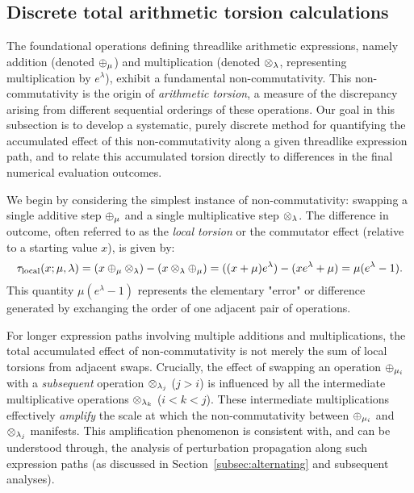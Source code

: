 \subsection{Discrete total arithmetic torsion calculations}\label{subsec:discrete-calculations}

The foundational operations defining threadlike arithmetic expressions, namely addition (denoted $\oplus_{\mu}$) and multiplication (denoted $\otimes_{\lambda}$, representing multiplication by $e^{\lambda}$), exhibit a fundamental non-commutativity. This non-commutativity is the origin of \emph{arithmetic torsion}, a measure of the discrepancy arising from different sequential orderings of these operations. Our goal in this subsection is to develop a systematic, purely discrete method for quantifying the accumulated effect of this non-commutativity along a given threadlike expression path, and to relate this accumulated torsion directly to differences in the final numerical evaluation outcomes.

We begin by considering the simplest instance of non-commutativity: swapping a single additive step $\oplus_{\mu}$ and a single multiplicative step $\otimes_{\lambda}$. The difference in outcome, often referred to as the \emph{local torsion} or the commutator effect (relative to a starting value $x$), is given by:
\begin{equation}
\tau_{\text{local}}(x; \mu, \lambda) = (x \oplus_{\mu} \otimes_{\lambda}) - (x \otimes_{\lambda} \oplus_{\mu}) = ( (x+\mu)e^{\lambda} ) - ( xe^{\lambda}+\mu ) = \mu(e^{\lambda} - 1).
\label{eq:local_torsion}
\end{equation}
This quantity $\mu(e^{\lambda}-1)$ represents the elementary "error" or difference generated by exchanging the order of one adjacent pair of operations.

For longer expression paths involving multiple additions and multiplications, the total accumulated effect of non-commutativity is not merely the sum of local torsions from adjacent swaps. Crucially, the effect of swapping an operation $\oplus_{\mu_i}$ with a \emph{subsequent} operation $\otimes_{\lambda_j}$ ($j>i$) is influenced by all the intermediate multiplicative operations $\otimes_{\lambda_k}$ ($i<k<j$). These intermediate multiplications effectively \emph{amplify} the scale at which the non-commutativity between $\oplus_{\mu_i}$ and $\otimes_{\lambda_j}$ manifests. This amplification phenomenon is consistent with, and can be understood through, the analysis of perturbation propagation along such expression paths (as discussed in Section~\ref{subsec:alternating} and subsequent analyses).

